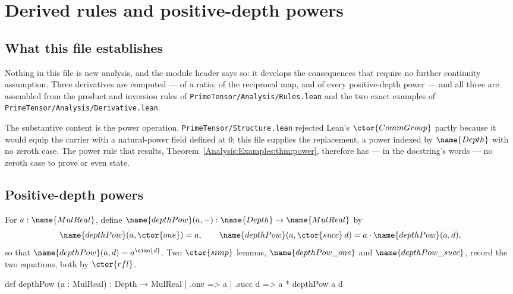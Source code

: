 
\section{Derived rules and positive-depth powers}
\label{Analysis:Examples:sec}


\subsection*{What this file establishes}

Nothing in this file is new analysis, and the module header says so: it
develops the consequences that require no further continuity assumption.  Three
derivatives are computed --- of a ratio, of the reciprocal map, and of every
positive-depth power --- and all three are assembled from the product and
inversion rules of \texttt{PrimeTensor/Analysis/Rules.lean} and the two exact
examples of \texttt{PrimeTensor/Analysis/Derivative.lean}.

The substantive content is the power operation.  \texttt{PrimeTensor/Structure.lean}
rejected Lean's $\ctor{CommGroup}$ partly because it would equip the carrier
with a natural-power field defined at $0$; this file supplies the replacement,
a power indexed by $\name{Depth}$ with no zeroth case.  The power rule that
results, Theorem~\ref{Analysis:Examples:thm:power}, therefore has --- in the
docstring's words --- no zeroth case to prove or even state.

\subsection{Positive-depth powers}

\begin{definition}\label{Analysis:Examples:def:pow}
For $a : \name{MulReal}$, define $\name{depthPow}(a,-) : \name{Depth} \to
\name{MulReal}$ by
\[
  \name{depthPow}(a, \ctor{one}) = a,
  \qquad
  \name{depthPow}(a, \ctor{succ}\,d) = a \cdot \name{depthPow}(a, d),
\]
so that $\name{depthPow}(a,d) = a^{\size{d}}$.  Two $\ctor{simp}$ lemmas,
$\name{depthPow\_one}$ and $\name{depthPow\_succ}$, record the two equations,
both by $\ctor{rfl}$.
\end{definition}

\begin{leancode}
def depthPow (a : MulReal) : Depth → MulReal
  | .one => a
  | .succ d => a * depthPow a d
\end{leancode}

